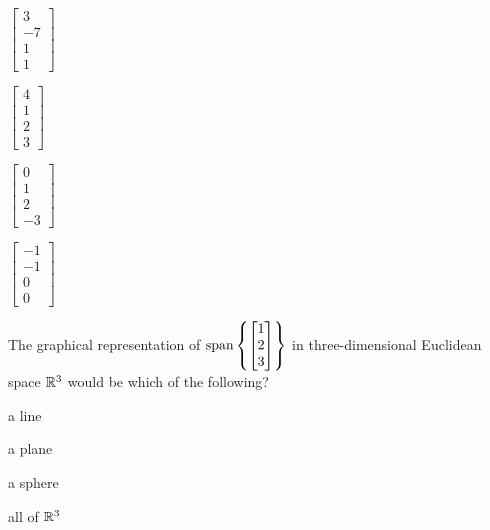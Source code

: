 \documentclass{article}
\begin{document}
\begin{readinessAssuranceTest}
  \begin{multicols}{4}
  \begin{readinessAssuranceTestChoices}
    \item \(
    \begin{bmatrix}
      3 \\ -7 \\ 1 \\ 1
    \end{bmatrix}
    \)
    \item \(
    \begin{bmatrix}
      4 \\ 1 \\ 2 \\ 3
    \end{bmatrix}
    \)
    \item \(
    \begin{bmatrix}
      0 \\ 1 \\ 2 \\ -3
    \end{bmatrix}
    \) %
    \item \(
    \begin{bmatrix}
      -1 \\ -1 \\ 0 \\ 0
    \end{bmatrix}
    \)
  \end{readinessAssuranceTestChoices}
  \end{multicols}

\item The graphical representation of \(\operatorname{span}\left\{
\begin{bmatrix}
  1 \\ 2 \\ 3
\end{bmatrix}\right\}\) in three-dimensional Euclidean space \(\mathbb{R}^3\) would be
which of the following?

  \begin{multicols}{4}
  \begin{readinessAssuranceTestChoices}
    \item a line %
    \item a plane
    \item a sphere
    \item all of \(\mathbb{R}^3\)
  \end{readinessAssuranceTestChoices}
  \end{multicols}



\end{readinessAssuranceTest}
\end{document}
